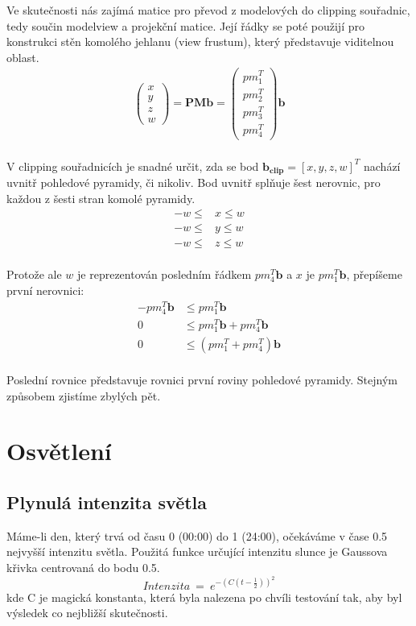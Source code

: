 \documentclass{zcu_sp}
\begin{document}
Ve skutečnosti nás zajímá matice pro převod z modelových do clipping souřadnic, tedy součin modelview a projekční matice. Její řádky se poté použijí pro konstrukci stěn komolého jehlanu (view frustum), který představuje viditelnou oblast.
\begin{align*}
\begin{pmatrix}x\\y\\z\\w\end{pmatrix} = \mathbf{PM} \mathbf{b} = \begin{pmatrix}pm_1^T\\pm_2^T\\pm_3^T\\pm_4^T\end{pmatrix} \mathbf{b}\\
\end{align*}

V clipping souřadnicích je snadné určit, zda se bod $\mathbf{b_{clip}} = \left[
x, y, z, w \right]^T$ nachází uvnitř pohledové pyramidy, či nikoliv. Bod uvnitř splňuje šest nerovnic, pro každou z šesti stran komolé pyramidy.
\begin{align*}
-w \leq & x \leq w \\
-w \leq & y \leq w \\
-w \leq & z \leq w \\
\end{align*}

Protože ale $w$ je reprezentován posledním řádkem $pm_4^T \mathbf{b}$ a $x$ je $pm_1^T \mathbf{b}$, přepíšeme první nerovnici:
\begin{align*}
-pm_4^T \mathbf{b} &\leq pm_1^T \mathbf{b} \\ 
0 &\leq pm_1^T \mathbf{b} + pm_4^T \mathbf{b} \\
0 &\leq (pm_1^T + pm_4^T) \mathbf{b} \\
\end{align*}

Poslední rovnice představuje rovnici první roviny pohledové pyramidy. Stejným způsobem zjistíme zbylých pět. 







\section{Osvětlení}
\subsection{Plynulá intenzita světla}
Máme-li den, který trvá od času 0 (00:00) do 1 (24:00), očekáváme v čase 0.5
nejvyšší intenzitu světla. Použitá funkce určující intenzitu slunce je Gaussova
křivka centrovaná do bodu 0.5.
$$
Intenzita~=~e^{- (C(t - \frac{1}{2}))^2}
$$
kde C je magická konstanta, která byla nalezena po chvíli testování tak, aby
byl výsledek co nejbližší skutečnosti.
\end{document}
